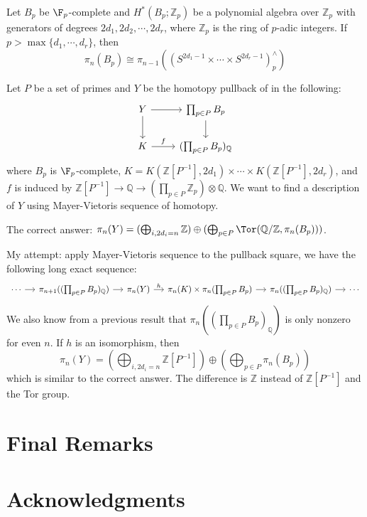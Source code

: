 \documentclass[psamsfonts]{amsart}
\theoremstyle{definition}
\newcommand{\Q}{\mathbb{Q}}
\newcommand{\Z}{\mathbb{Z}}
\numberwithin{equation}{section}
\begin{document}
Let $B_p$ be $\F_p$-complete and $H^\ast(B_p;\Z_p)$ be a polynomial algebra over $\Z_p$ with generators of degrees $2d_1,2d_2,\cdots,2d_r$, where $\Z_p$ is the ring of $p$-adic integers. If $p>\max\{d_1,\cdots,d_r\}$, then
\[\pi_n(B_p)\cong\pi_{n-1}\left((S^{2d_1-1}\times\cdots\times S^{2d_r-1})_p^\wedge\right)\]\medbreak

\noindent Let $P$ be a set of primes and $Y$ be the homotopy pullback of in the following:
\[\begin{tikzcd}
Y\arrow[r]\arrow[d]&\prod_{p\in P}B_p\arrow[d]\\
K\arrow[r,"f"]&(\prod_{p\in P}B_p)_\Q
\end{tikzcd}\]
where $B_p$ is $\F_p$-complete, $K=K(\Z[P^{-1}],2d_1)\times\cdots\times K(\Z[P^{-1}],2d_r)$, and $f$ is induced by $\Z[P^{-1}]\to\Q\to(\prod_{p\in P}\Z_p)\otimes\Q$. We want to find a description of $Y$ using Mayer-Vietoris sequence of homotopy.\medbreak

\noindent The correct answer: $\pi_n(Y)=(\bigoplus_{i,2d_i=n}\Z)\oplus(\bigoplus_{p\in P}\Tor(\Q/\Z,\pi_n(B_p)))$.\medbreak

\noindent My attempt: apply Mayer-Vietoris sequence to the pullback square, we have the following long exact sequence:
\[\begin{tikzcd}[column sep=small]
\cdots\arrow[r]&\pi_{n+1}((\prod_{p\in P}B_p)_\Q)\arrow[r]&\pi_n(Y)\arrow[r,"h"]&\pi_n(K)\times\pi_n(\prod_{p\in P}B_p)\arrow[r]&\pi_n((\prod_{p\in P}B_p)_\Q)\arrow[r]&\cdots
\end{tikzcd}\]
We also know from a previous result that $\pi_n((\prod_{p\in P}B_p)_\Q)$ is only nonzero for even $n$. If $h$ is an isomorphism, then
\[\textstyle{\pi_n(Y)=(\bigoplus_{i,2d_i=n}\Z[P^{-1}])\oplus(\bigoplus_{p\in P}\pi_n(B_p))}\]
which is similar to the correct answer. The difference is $\Z$ instead of $\Z[P^{-1}]$ and the Tor group.


\section{Final Remarks}

\section*{Acknowledgments}
\end{document}
